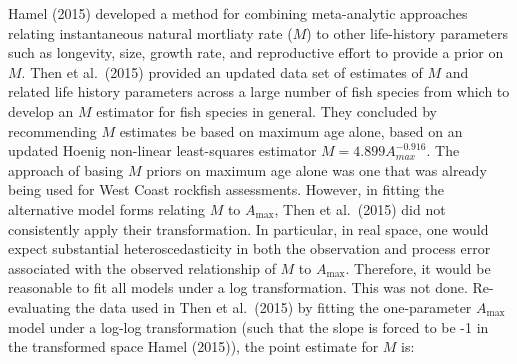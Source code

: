 \documentclass[11pt,
  english,
  a4paper,
]{article}
\begin{document}
Hamel {(2015)\leavevmode\tagmcend\tagstructend} developed a method for combining meta-analytic approaches relating instantaneous natural mortliaty rate ({\(M\)\leavevmode\tagmcend\tagstructend}) to other life-history parameters such as longevity, size, growth rate, and reproductive effort to provide a prior on {\(M\)\leavevmode\tagmcend\tagstructend}. Then et al.~{(2015)\leavevmode\tagmcend\tagstructend} provided an updated data set of estimates of {\(M\)\leavevmode\tagmcend\tagstructend} and related life history parameters across a large number of fish species from which to develop an {\(M\)\leavevmode\tagmcend\tagstructend} estimator for fish species in general. They concluded by recommending {\(M\)\leavevmode\tagmcend\tagstructend} estimates be based on maximum age alone, based on an updated Hoenig non-linear least-squares estimator {\(M=4.899A^{-0.916}_{max}\)\leavevmode\tagmcend\tagstructend}. The approach of basing {\(M\)\leavevmode\tagmcend\tagstructend} priors on maximum age alone was one that was already being used for West Coast rockfish assessments. However, in fitting the alternative model forms relating {\(M\)\leavevmode\tagmcend\tagstructend} to {\(A_{\text{max}}\)\leavevmode\tagmcend\tagstructend}, Then et al.~{(2015)\leavevmode\tagmcend\tagstructend} did not consistently apply their transformation. In particular, in real space, one would expect substantial heteroscedasticity in both the observation and process error associated with the observed relationship of {\(M\)\leavevmode\tagmcend\tagstructend} to {\(A_{\text{max}}\)\leavevmode\tagmcend\tagstructend}. Therefore, it would be reasonable to fit all models under a log transformation. This was not done. Re-evaluating the data used in Then et al.~{(2015)\leavevmode\tagmcend\tagstructend} by fitting the one-parameter {\(A_{\text{max}}\)\leavevmode\tagmcend\tagstructend} model under a log-log transformation (such that the slope is forced to be -1 in the transformed space Hamel {(2015)\leavevmode\tagmcend\tagstructend}), the point estimate for {\(M\)\leavevmode\tagmcend\tagstructend} is:
\end{document}
